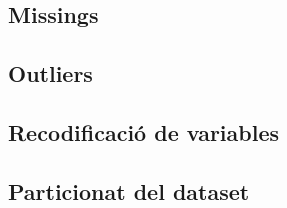 \subsection{Missings}

\subsection{Outliers}

\subsection{Recodificació de variables}

\subsection{Particionat del dataset}
